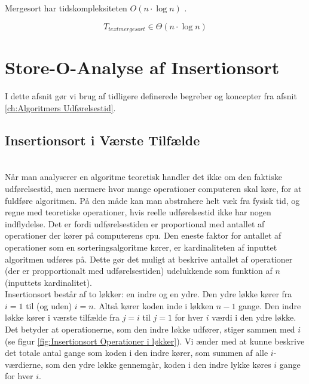 \section{}
\label{sec:Tidskompleksiteten af Mergesort}

Mergesort har tidskompleksiteten $O(n \cdot \log n)$ \red{[kilde]}.

$$T_{text{mergesort}} \in \Theta (n \cdot \log n)$$


\section{Store-O-Analyse af Insertionsort}
\label{sec:Analyse af Insertionsort}

I dette afsnit gør vi brug af tidligere definerede begreber og koncepter fra afsnit \ref{ch:Algoritmers Udførelsestid}.

\subsection{Insertionsort i Værste Tilfælde}%
\label{sub:Insertionsort i Værste Tilfælde}


\cite[s. 42]{aogd}\\

Når man analyserer en algoritme teoretisk handler det ikke om den faktiske udførelsestid, men nærmere hvor mange operationer computeren skal køre, for at fuldføre algoritmen. På den måde kan man abstrahere helt væk fra fysisk tid, og regne med teoretiske operationer, hvis reelle udførelsestid ikke har nogen indflydelse. Det er fordi udførelsestiden er proportional med antallet af operationer der kører på computerens cpu. Den eneste faktor for antallet af operationer som en sorteringsalgoritme kører, er kardinaliteten af inputtet algoritmen udføres på. Dette gør det muligt at beskrive antallet af operationer (der er propportionalt med udførelsestiden) udelukkende som funktion af $n$ (inputtets kardinalitet).\\

Insertionsort består af to løkker: en indre og en ydre. Den ydre løkke kører fra $i = 1$ til (og uden) $i = n$. Altså kører koden inde i løkken $n - 1$ gange. Den indre løkke kører i værste tilfælde fra $j = i$ til $j = 1$ for hver $i$ værdi i den ydre løkke. Det betyder at operationerne, som den indre løkke udfører, stiger sammen med $i$ (se figur \ref{fig:Insertionsort Operationer i løkker}). Vi ænder med at kunne beskrive det totale antal gange som koden i den indre kører, som summen af alle $i$-værdierne, som den ydre løkke gennemgår, koden i den indre lykke køres $i$ gange for hver $i$.

